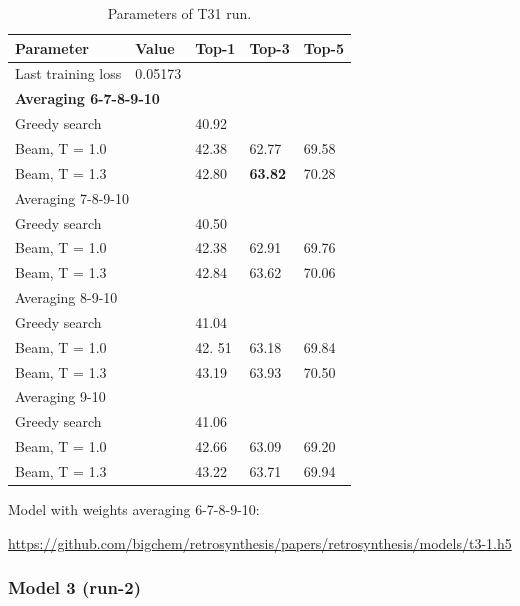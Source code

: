 \documentclass{article}
\begin{document}
\begin{table}[h!]
\caption{Parameters of T31 run.}
  \centering
  \begin{tabular}{p{8.2cm}p{1.5cm}p{1.5cm}p{1.5cm}p{1.5cm}}
    \toprule
    Parameter & Value & Top-1 & Top-3 & Top-5 \\
    \midrule
    Last training loss & 0.05173 & & & \\
    \midrule
    \multicolumn{5}{l}{\textbf{Averaging 6-7-8-9-10}} \\ \midrule
    Greedy search  & & 40.92 & & \\
    Beam, T = 1.0  & & 42.38 & 62.77 & 69.58  \\
    Beam, T = 1.3 & & 42.80 & \textbf{63.82} & 70.28 \\ 
    \midrule
    \multicolumn{5}{l}{Averaging 7-8-9-10} \\ \midrule
    Greedy search  & & 40.50 & & \\
    Beam, T = 1.0  & & 42.38 & 62.91 & 69.76  \\
    Beam, T = 1.3 & & 42.84 & 63.62 & 70.06 \\ \midrule
    \multicolumn{5}{l}{Averaging 8-9-10} \\ \midrule
    Greedy search  & & 41.04 & & \\
    Beam, T = 1.0  & & 42. 51 & 63.18  &  69.84  \\
    Beam, T = 1.3 & & 43.19 & 63.93 & 70.50 \\ \midrule
    \multicolumn{5}{l}{Averaging 9-10} \\ \midrule
    Greedy search  & & 41.06  & & \\
    Beam, T = 1.0  & & 42.66 & 63.09 & 69.20  \\
    Beam, T = 1.3 & & 43.22 & 63.71 &  69.94\\ 
    \bottomrule
  \end{tabular}
  \label{tbl:t31}
\end{table} 

Model with weights averaging 6-7-8-9-10:

\url{https://github.com/bigchem/retrosynthesis/papers/retrosynthesis/models/t3-1.h5}

\newpage
 
\subsubsection{Model 3 (run-2)}
 
\end{document}
